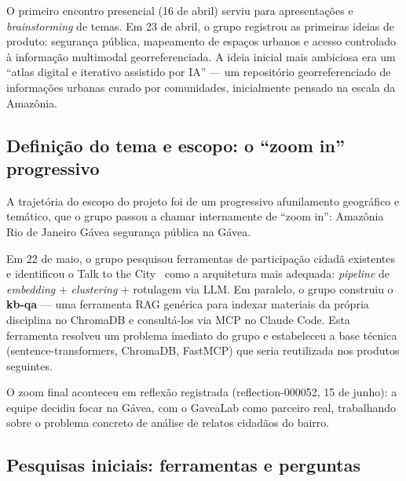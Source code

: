 \documentclass[12pt,a4paper]{article}
\begin{document}
O primeiro encontro presencial (16 de abril) serviu para apresentações e
\textit{brainstorming} de temas. Em 23 de abril, o grupo registrou as primeiras ideias
de produto: segurança pública, mapeamento de espaços urbanos e acesso controlado à
informação multimodal georreferenciada. A ideia inicial mais ambiciosa era um
``atlas digital e iterativo assistido por IA'' — um repositório georreferenciado de
informações urbanas curado por comunidades, inicialmente pensado na escala da Amazônia.


\subsection{Definição do tema e escopo: o ``zoom in'' progressivo}

A trajetória do escopo do projeto foi de um progressivo afunilamento geográfico e
temático, que o grupo passou a chamar internamente de ``zoom in'': Amazônia \textrightarrow{} Rio
de Janeiro \textrightarrow{} Gávea \textrightarrow{} segurança pública na Gávea.

Em 22 de maio, o grupo pesquisou ferramentas de participação cidadã
existentes~\cite{decidim,polis} e identificou o Talk to the City~\cite{tttc2023} como
a arquitetura mais adequada: \textit{pipeline} de \textit{embedding} + \textit{clustering}
+ rotulagem via LLM. Em paralelo, o grupo construiu o \textbf{kb-qa} — uma ferramenta
RAG genérica para indexar materiais da própria disciplina no ChromaDB e consultá-los
via MCP no Claude Code. Esta ferramenta resolveu um problema imediato do grupo e
estabeleceu a base técnica (sentence-transformers, ChromaDB, FastMCP) que seria
reutilizada nos produtos seguintes.

O zoom final aconteceu em reflexão registrada (reflection-000052, 15 de junho): a
equipe decidiu focar na Gávea, com o GaveaLab como parceiro real, trabalhando sobre o
problema concreto de análise de relatos cidadãos do bairro.


\subsection{Pesquisas iniciais: ferramentas e perguntas}
\end{document}
